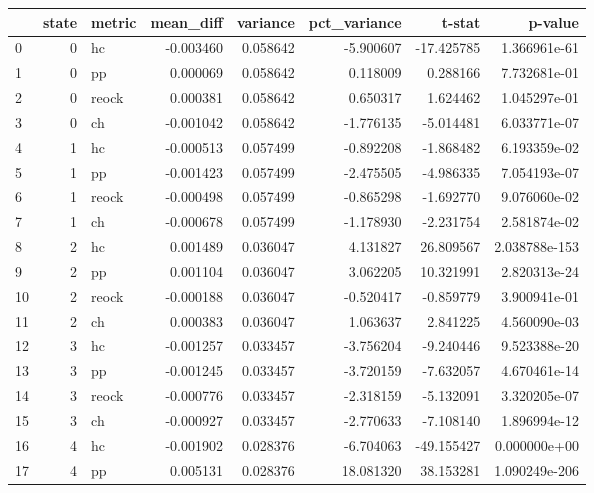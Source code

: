 \documentclass[]{article}
\begin{document}
\begin{tabular}{lrlrrrrr}
\toprule
{} &  state & metric &  mean\_diff &  variance &  pct\_variance &      t-stat &        p-value \\
\midrule
0  &      0 &     hc &  -0.003460 &  0.058642 &     -5.900607 &  -17.425785 &   1.366961e-61 \\
1  &      0 &     pp &   0.000069 &  0.058642 &      0.118009 &    0.288166 &   7.732681e-01 \\
2  &      0 &  reock &   0.000381 &  0.058642 &      0.650317 &    1.624462 &   1.045297e-01 \\
3  &      0 &     ch &  -0.001042 &  0.058642 &     -1.776135 &   -5.014481 &   6.033771e-07 \\
4  &      1 &     hc &  -0.000513 &  0.057499 &     -0.892208 &   -1.868482 &   6.193359e-02 \\
5  &      1 &     pp &  -0.001423 &  0.057499 &     -2.475505 &   -4.986335 &   7.054193e-07 \\
6  &      1 &  reock &  -0.000498 &  0.057499 &     -0.865298 &   -1.692770 &   9.076060e-02 \\
7  &      1 &     ch &  -0.000678 &  0.057499 &     -1.178930 &   -2.231754 &   2.581874e-02 \\
8  &      2 &     hc &   0.001489 &  0.036047 &      4.131827 &   26.809567 &  2.038788e-153 \\
9  &      2 &     pp &   0.001104 &  0.036047 &      3.062205 &   10.321991 &   2.820313e-24 \\
10 &      2 &  reock &  -0.000188 &  0.036047 &     -0.520417 &   -0.859779 &   3.900941e-01 \\
11 &      2 &     ch &   0.000383 &  0.036047 &      1.063637 &    2.841225 &   4.560090e-03 \\
12 &      3 &     hc &  -0.001257 &  0.033457 &     -3.756204 &   -9.240446 &   9.523388e-20 \\
13 &      3 &     pp &  -0.001245 &  0.033457 &     -3.720159 &   -7.632057 &   4.670461e-14 \\
14 &      3 &  reock &  -0.000776 &  0.033457 &     -2.318159 &   -5.132091 &   3.320205e-07 \\
15 &      3 &     ch &  -0.000927 &  0.033457 &     -2.770633 &   -7.108140 &   1.896994e-12 \\
16 &      4 &     hc &  -0.001902 &  0.028376 &     -6.704063 &  -49.155427 &   0.000000e+00 \\
17 &      4 &     pp &   0.005131 &  0.028376 &     18.081320 &   38.153281 &  1.090249e-206 \\

\end{tabular}
\end{document}
